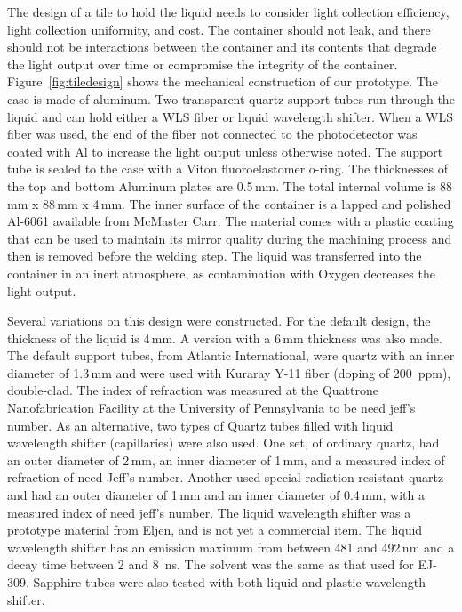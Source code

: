 \documentclass[review]{elsarticle}
\begin{document}
The design of a tile to hold the liquid needs to consider light
collection efficiency, light collection uniformity, and cost. The
container should not leak, and there should not be interactions
between the container and its contents that degrade the light output
over time or compromise the integrity of the
container. Figure~\ref{fig:tiledesign} shows the mechanical
construction of our prototype. The case is made of aluminum. Two
transparent quartz support tubes
run through the
liquid and can hold either a WLS fiber or liquid
wavelength shifter.
When a WLS fiber was
used, the end of the fiber not connected to the photodetector was
coated with Al to increase the light output unless otherwise
noted. The support tube is sealed to the case with a Viton
fluoroelastomer o-ring. The thicknesses of the top and bottom Aluminum
plates are 0.5\,mm. The total internal volume is 88\,mm x 88\,mm x
4\,mm. The inner surface of the container is a lapped and polished
Al-6061 available from McMaster Carr. The material comes with a
plastic coating that can be used to maintain its mirror quality during
the machining process and then is removed before the welding step. The
liquid was transferred into the container in an inert atmosphere, as
contamination with Oxygen decreases the light output.

Several variations on this design were constructed. For the default
design, the thickness of the liquid is 4\,mm. A version with a 6\,mm
thickness was also made. The default
support tubes, from Atlantic International, were quartz with an inner
diameter of 1.3\,mm and were used with Kuraray Y-11 fiber (doping of
200~ppm), double-clad.
The index of refraction was measured at the Quattrone
Nanofabrication Facility at the University of Pennsylvania to be
{\color{red} need jeff's number}.
As an alternative, two types of
Quartz tubes filled with liquid wavelength
shifter (capillaries) were also used.  
One set, of ordinary quartz, had an outer diameter of 2\,mm,
an inner diameter of 1\,mm, and a measured index of refraction of {\color{red} need Jeff's number}.
Another used special radiation-resistant quartz and had an outer diameter of 1\,mm and an
inner diameter of 0.4\,mm, with a measured index of {\color{red} need
  jeff's number}.
The liquid wavelength shifter was a prototype
material from Eljen, and is not yet a commercial item. The liquid
wavelength shifter has an emission maximum from between 481 and 492\,nm
and a decay time between 2 and 8~ns. The solvent was the same as that
used for EJ-309. Sapphire tubes were also tested with both liquid and
plastic wavelength shifter.
\end{document}
